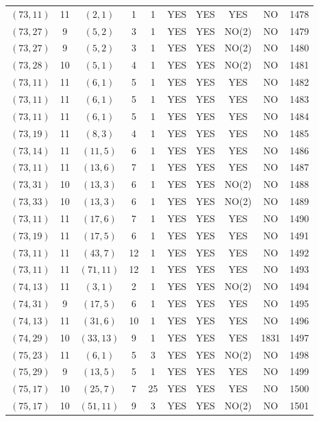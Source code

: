 \begin{longtable}{|c|c|c|c|c|c|c|c|c|c|}
$(73, 11)$ & 11 & $(2, 1)$ & 1 & 1 & YES & YES & YES & NO & 1478\\
$(73, 27)$ & 9 & $(5, 2)$ & 3 & 1 & YES & YES & NO(2) & NO & 1479\\
$(73, 27)$ & 9 & $(5, 2)$ & 3 & 1 & YES & YES & NO(2) & NO & 1480\\
$(73, 28)$ & 10 & $(5, 1)$ & 4 & 1 & YES & YES & NO(2) & NO & 1481\\
$(73, 11)$ & 11 & $(6, 1)$ & 5 & 1 & YES & YES & YES & NO & 1482\\
$(73, 11)$ & 11 & $(6, 1)$ & 5 & 1 & YES & YES & YES & NO & 1483\\
$(73, 11)$ & 11 & $(6, 1)$ & 5 & 1 & YES & YES & YES & NO & 1484\\
$(73, 19)$ & 11 & $(8, 3)$ & 4 & 1 & YES & YES & YES & NO & 1485\\
$(73, 14)$ & 11 & $(11, 5)$ & 6 & 1 & YES & YES & YES & NO & 1486\\
$(73, 11)$ & 11 & $(13, 6)$ & 7 & 1 & YES & YES & YES & NO & 1487\\
$(73, 31)$ & 10 & $(13, 3)$ & 6 & 1 & YES & YES & NO(2) & NO & 1488\\
$(73, 33)$ & 10 & $(13, 3)$ & 6 & 1 & YES & YES & NO(2) & NO & 1489\\
$(73, 11)$ & 11 & $(17, 6)$ & 7 & 1 & YES & YES & YES & NO & 1490\\
$(73, 19)$ & 11 & $(17, 5)$ & 6 & 1 & YES & YES & YES & NO & 1491\\
$(73, 11)$ & 11 & $(43, 7)$ & 12 & 1 & YES & YES & YES & NO & 1492\\
$(73, 11)$ & 11 & $(71, 11)$ & 12 & 1 & YES & YES & YES & NO & 1493\\
$(74, 13)$ & 11 & $(3, 1)$ & 2 & 1 & YES & YES & NO(2) & NO & 1494\\
$(74, 31)$ & 9 & $(17, 5)$ & 6 & 1 & YES & YES & YES & NO & 1495\\
$(74, 13)$ & 11 & $(31, 6)$ & 10 & 1 & YES & YES & YES & NO & 1496\\
$(74, 29)$ & 10 & $(33, 13)$ & 9 & 1 & YES & YES & YES & 1831 & 1497\\
$(75, 23)$ & 11 & $(6, 1)$ & 5 & 3 & YES & YES & NO(2) & NO & 1498\\
$(75, 29)$ & 9 & $(13, 5)$ & 5 & 1 & YES & YES & YES & NO & 1499\\
$(75, 17)$ & 10 & $(25, 7)$ & 7 & 25 & YES & YES & YES & NO & 1500\\
$(75, 17)$ & 10 & $(51, 11)$ & 9 & 3 & YES & YES & NO(2) & NO & 1501\\

\end{longtable}
